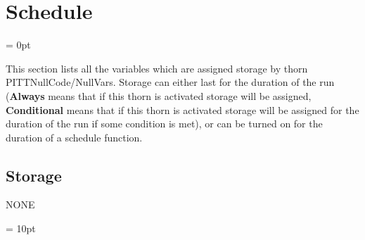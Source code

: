 
\section{Schedule} 


\parskip = 0pt


\noindent This section lists all the variables which are assigned storage by thorn PITTNullCode/NullVars.  Storage can either last for the duration of the run ({\bf Always} means that if this thorn is activated storage will be assigned, {\bf Conditional} means that if this thorn is activated storage will be assigned for the duration of the run if some condition is met), or can be turned on for the duration of a schedule function.


\subsection*{Storage}NONE

\vspace{5mm}\parskip = 10pt 
